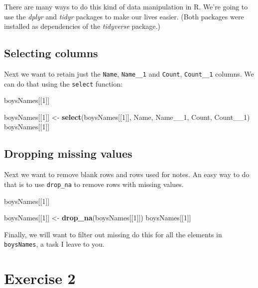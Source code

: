 \documentclass[]{book}
\newenvironment{Shaded}{\begin{snugshade}}{\end{snugshade}}
\newcommand{\KeywordTok}[1]{\textcolor[rgb]{0.13,0.29,0.53}{\textbf{#1}}}
\newcommand{\DecValTok}[1]{\textcolor[rgb]{0.00,0.00,0.81}{#1}}
\newcommand{\StringTok}[1]{\textcolor[rgb]{0.31,0.60,0.02}{#1}}
\newcommand{\NormalTok}[1]{#1}
\begin{document}
There are many ways to do this kind of data manipulation in R. We're
going to use the \emph{dplyr} and \emph{tidyr} packages to make our
lives easier. (Both packages were installed as dependencies of the
\emph{tidyverse} package.)

\subsection{Selecting columns}\label{selecting-columns}

Next we want to retain just the \texttt{Name}, \texttt{Name\_\_1} and
\texttt{Count}, \texttt{Count\_\_1} columns. We can do that using the
\texttt{select} function:

\begin{Shaded}
\begin{Highlighting}[]
\NormalTok{boysNames[[}\DecValTok{1}\NormalTok{]]}

\NormalTok{boysNames[[}\DecValTok{1}\NormalTok{]] <-}\StringTok{ }\KeywordTok{select}\NormalTok{(boysNames[[}\DecValTok{1}\NormalTok{]], Name, Name__}\DecValTok{1}\NormalTok{, Count, Count__}\DecValTok{1}\NormalTok{)}
\NormalTok{boysNames[[}\DecValTok{1}\NormalTok{]]}
\end{Highlighting}
\end{Shaded}

\subsection{Dropping missing values}\label{dropping-missing-values}

Next we want to remove blank rows and rows used for notes. An easy way
to do that is to use \texttt{drop\_na} to remove rows with missing
values.

\begin{Shaded}
\begin{Highlighting}[]
\NormalTok{boysNames[[}\DecValTok{1}\NormalTok{]]}

\NormalTok{boysNames[[}\DecValTok{1}\NormalTok{]] <-}\StringTok{ }\KeywordTok{drop_na}\NormalTok{(boysNames[[}\DecValTok{1}\NormalTok{]])}
\NormalTok{boysNames[[}\DecValTok{1}\NormalTok{]]}
\end{Highlighting}
\end{Shaded}

Finally, we will want to filter out missing do this for all the elements
in \texttt{boysNames}, a task I leave to you.

\section{Exercise 2}\label{exercise-2-3}
\end{document}
